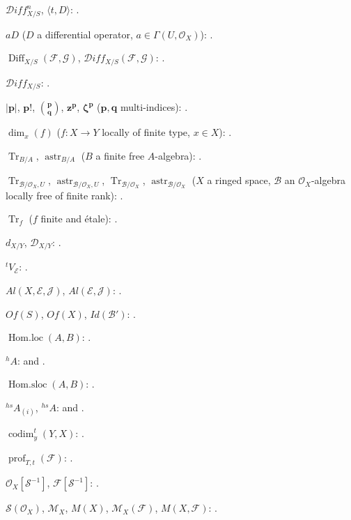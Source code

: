 $\mathcal{D}iff^{n}_{X/S}$, $\langle t,D\rangle$:
.

$aD$ ($D$ a differential operator, $a\in\Gamma(U,\mathcal{O}_X)$):
.

$\operatorname{Diff}_{X/S}(\mathcal{F},\mathcal{G})$,
$\mathcal{D}iff_{X/S}(\mathcal{F},\mathcal{G})$:
.

$\mathcal{D}iff_{X/S}$: .

$|\mathbf p|$, $\mathbf p!$, $\binom{\mathbf p}{\mathbf q}$,
$\mathbf z^{\mathbf p}$, $\boldsymbol\zeta^{\mathbf p}$
($\mathbf p,\mathbf q$ multi-indices): .

$\dim_x(f)$ ($f:X\to Y$ locally of finite type, $x\in X$):
.

$\operatorname{Tr}_{B/A}$, $\operatorname{astr}_{B/A}$
($B$ a finite free $A$-algebra): .

$\operatorname{Tr}_{\mathcal B/\mathcal O_X,U}$,
$\operatorname{astr}_{\mathcal B/\mathcal O_X,U}$,
$\operatorname{Tr}_{\mathcal B/\mathcal O_X}$,
$\operatorname{astr}_{\mathcal B/\mathcal O_X}$
($X$ a ringed space, $\mathcal B$ an $\mathcal O_X$-algebra locally free
of finite rank): .

$\operatorname{Tr}_f$ ($f$ finite and \'etale): .

$d_{X/Y}$, $\mathcal D_{X/Y}$: .

${}^{t}V_{\mathcal E}$: .

$Al(X,\mathcal E,\mathcal J)$, $Al(\mathcal E,\mathcal J)$:
.

$Of(S)$, $Of(X)$, $Id(\mathcal B')$: .

$\operatorname{Hom.loc}(A,B)$: .

${}^{h}A$:  and .

$\operatorname{Hom.sloc}(A,B)$: .

${}^{hs}A_{(i)}$, ${}^{hs}A$:  and
.

$\operatorname{codim}^{t}_{y}(Y,X)$: .

$\operatorname{prof}_{T,t}(\mathcal F)$: .

$\mathcal O_X[\mathcal S^{-1}]$, $\mathcal F[\mathcal S^{-1}]$:
.

$\mathcal S(\mathcal O_X)$, $\mathcal M_X$, $M(X)$,
$\mathcal M_X(\mathcal F)$, $M(X,\mathcal F)$:
.

